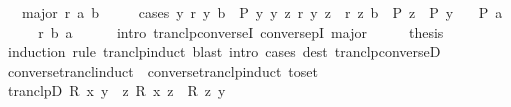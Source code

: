 \begin{isabellebody}
\ \ \ major{\isacharcolon}{\kern0pt}\ {\isachardoublequoteopen}r\isactrlsup {\isacharplus}{\kern0pt}\isactrlsup {\isacharplus}{\kern0pt}\ a\ b{\isachardoublequoteclose}\isanewline
\ \ \ \ \ cases{\isacharcolon}{\kern0pt}\ {\isachardoublequoteopen}{\isasymAnd}y{\isachardot}{\kern0pt}\ r\ y\ b\ {\isasymLongrightarrow}\ P\ y{\isachardoublequoteclose}\ {\isachardoublequoteopen}{\isasymAnd}y\ z{\isachardot}{\kern0pt}\ r\ y\ z\ {\isasymLongrightarrow}\ r\isactrlsup {\isacharplus}{\kern0pt}\isactrlsup {\isacharplus}{\kern0pt}\ z\ b\ {\isasymLongrightarrow}\ P\ z\ {\isasymLongrightarrow}\ P\ y{\isachardoublequoteclose}\isanewline
\ \ \ {\isachardoublequoteopen}P\ a{\isachardoublequoteclose}\isanewline
%
\isadelimproof
%
\endisadelimproof
%
\isatagproof
{}\isamarkupfalse%
\ {\isacharminus}{\kern0pt}\isanewline
\ \ \isamarkupfalse%
\ {\isachardoublequoteopen}r{\isasyminverse}{\isasyminverse}\isactrlsup {\isacharplus}{\kern0pt}\isactrlsup {\isacharplus}{\kern0pt}\ b\ a{\isachardoublequoteclose}\isanewline
\ \ \ \ \isamarkupfalse%
\ {\isacharparenleft}{\kern0pt}intro\ tranclp{\isacharunderscore}{\kern0pt}converseI\ conversepI\ major{\isacharparenright}{\kern0pt}\isanewline
\ \ \isamarkupfalse%
\ \isamarkupfalse%
\ {\isacharquery}{\kern0pt}thesis\isanewline
\ \ \ \ \isamarkupfalse%
\ {\isacharparenleft}{\kern0pt}induction\ rule{\isacharcolon}{\kern0pt}\ tranclp{\isacharunderscore}{\kern0pt}induct{\isacharparenright}{\kern0pt}\ {\isacharparenleft}{\kern0pt}blast\ intro{\isacharcolon}{\kern0pt}\ cases\ dest{\isacharcolon}{\kern0pt}\ tranclp{\isacharunderscore}{\kern0pt}converseD{\isacharparenright}{\kern0pt}{\isacharplus}{\kern0pt}\isanewline
{}\isamarkupfalse%
%
\endisatagproof
{\isafoldproof}%
%
\isadelimproof
\isanewline
%
\endisadelimproof
\isanewline
{}\isamarkupfalse%
\ converse{\isacharunderscore}{\kern0pt}trancl{\isacharunderscore}{\kern0pt}induct\ {\isacharequal}{\kern0pt}\ converse{\isacharunderscore}{\kern0pt}tranclp{\isacharunderscore}{\kern0pt}induct\ {\isacharbrackleft}{\kern0pt}to{\isacharunderscore}{\kern0pt}set{\isacharbrackright}{\kern0pt}\isanewline
\isanewline
{}\isamarkupfalse%
\ tranclpD{\isacharcolon}{\kern0pt}\ {\isachardoublequoteopen}R\isactrlsup {\isacharplus}{\kern0pt}\isactrlsup {\isacharplus}{\kern0pt}\ x\ y\ {\isasymLongrightarrow}\ {\isasymexists}z{\isachardot}{\kern0pt}\ R\ x\ z\ {\isasymand}\ R\isactrlsup {\isacharasterisk}{\kern0pt}\isactrlsup {\isacharasterisk}{\kern0pt}\ z\ y{\isachardoublequoteclose}\isanewline

\end{isabellebody}
